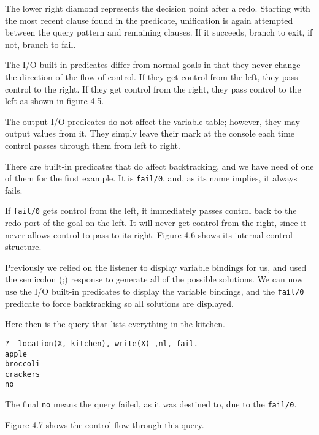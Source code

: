 The lower right diamond represents the decision point after a redo. Starting
with the most recent clause found in the predicate, unification is again
attempted between the query pattern and remaining clauses. If it succeeds,
branch to exit, if not, branch to fail.

The I/O built-in predicates differ from normal goals in that they never change
the direction of the flow of control. If they get control from the left, they
pass control to the right. If they get control from the right, they pass control
to the left as shown in figure 4.5.


The output I/O predicates do not affect the variable table; however, they may
output values from it. They simply leave their mark at the console each time
control passes through them from left to right.

There are built-in predicates that do affect backtracking, and we have need of
one of them for the first example. It is \verb|fail/0|, and, as its name
implies, it always fails.

If \verb|fail/0| gets control from the left, it immediately passes control back
to the redo port of the goal on the left. It will never get control from the
right, since it never allows control to pass to its right. Figure 4.6 shows its
internal control structure.


Previously we relied on the listener to display variable bindings for us, and
used the semicolon (;) response to generate all of the possible solutions. We
can now use the I/O built-in predicates to display the variable bindings, and
the \verb|fail/0| predicate to force backtracking so all solutions are
displayed.

Here then is the query that lists everything in the kitchen.
\begin{verbatim}
?- location(X, kitchen), write(X) ,nl, fail.
apple
broccoli
crackers
no
\end{verbatim}

The final \verb'no' means the query failed, as it was destined to, due to the
\verb|fail/0|.

Figure 4.7 shows the control flow through this query.




     
\secup